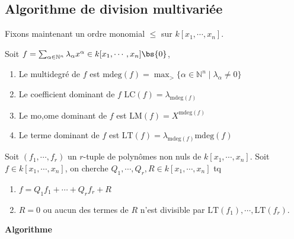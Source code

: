         \subsection{Algorithme de division multivariée}
            Fixons maintenant un ordre monomial $\leq$ sur $k[x_1, \cdots, x_n]$.
            \begin{defi}
                Soit $f = \sum_{\alpha \in \mathbb{N}^n} \lambda_\alpha x^\alpha \in k[x_1, \cdots, x_n] \bs \{0\}$, 
                \begin{enumerate}
                    \item Le multidegré de $f$ est $\mathrm{mdeg}(f) = \max_> \{\alpha \in \mathbb{N}^n \mid \lambda_\alpha \neq 0\}$
                    \item Le coefficient dominant de $f$ $\mathrm{LC}(f) = \lambda_{\mathrm{mdeg}(f)}$
                    \item Le mo,ome dominant de $f$ est $\mathrm{LM}(f) = X^{\mathrm{mdeg}(f)}$
                    \item Le terme dominant de $f$ est $\mathrm{LT}(f) = \lambda_{\mathrm{mdeg}(f)}{\mathrm{mdeg}(f)}$
                \end{enumerate}
            \end{defi}
            Soit $(f_1, \cdots, f_r)$ un $r$-tuple de polynômes non nuls de $k[x_1, \cdots, x_n]$. Soit $f \in k[x_1, \cdots, x_n]$, on cherche $Q_1, \cdots, Q_r, R \in k[x_1, \cdots, x_n]$ tq
            \begin{enumerate}
                \item $f = Q_1f_1 + \cdots + Q_r f_r + R$
                \item $R = 0$ ou aucun des termes de $R$ n'est divisible par $\mathrm{LT}(f_1), \cdots, \mathrm{LT}(f_r)$.
            \end{enumerate}
            \textbf{Algorithme}
